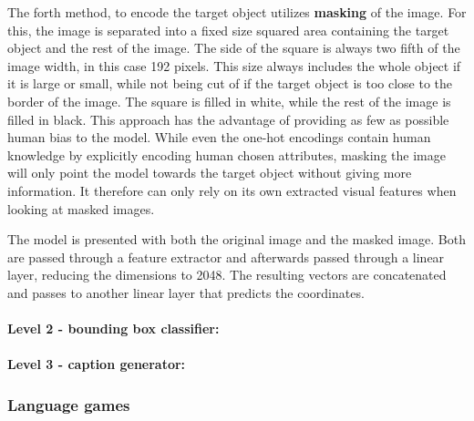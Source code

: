 The forth method, to encode the target object utilizes \textbf{masking} of the image.
For this, the image is separated into a fixed size squared area containing the target object and the rest of the image.
The side of the square is always two fifth of the image width, in this case 192 pixels.
This size always includes the whole object if it is large or small, while not being cut of if the target object is too close to the border of the image.
The square is filled in white, while the rest of the image is filled in black.
This approach has the advantage of providing as few as possible human bias to the model.
While even the one-hot encodings contain human knowledge by explicitly encoding human chosen attributes, masking the image will only point the model towards the target object without giving more information.
It therefore can only rely on its own extracted visual features when looking at masked images.

The model is presented with both the original image and the masked image.
Both are passed through a feature extractor and afterwards passed through a linear layer, reducing the dimensions to 2048.
The resulting vectors are concatenated and passes to another linear layer that predicts the coordinates.


\paragraph{Level 2 - bounding box classifier:}

\paragraph{Level 3 - caption generator:}



\subsubsection{Language games}